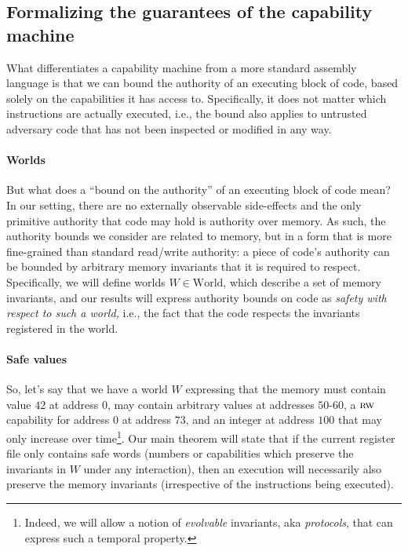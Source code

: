 \documentclass[format=acmsmall, review=true, screen=true]{acmart}
\newcommand{\plaindom}[1]{\mathrm{#1}}
\newcommand{\Worlds}{\plaindom{World}}
\newcommand{\plainperm}[1]{\textsc{#1}}
\newcommand{\readwrite}{\plainperm{rw}}
\newenvironment{toplas}{}{}
\begin{document}
\begin{toplas}
\subsection{Formalizing the guarantees of the capability machine}
\label{sec:formalizing-guarantees}
What differentiates a capability machine from a more standard assembly language
is that we can bound the authority of an executing block of code, based solely
on the capabilities it has access to. Specifically, it does not matter which
instructions are actually executed, i.e., the bound also applies to untrusted
adversary code that has not been inspected or modified in any way.

\paragraph{Worlds}
But what does a ``bound on the authority'' of an executing block of code mean?
In our setting, there are no externally observable side-effects and the only
primitive authority that code may hold is authority over memory. As such, the
authority bounds we consider are related to memory, but in a form that is more
fine-grained than standard read/write authority: a piece of code's authority can be bounded
by arbitrary memory invariants that it is required to respect. Specifically, we
will define worlds $W \in \Worlds$, which describe a set of memory invariants, and
our results will express authority bounds on code as \emph{safety with respect to such
a world,} i.e., the fact that the code respects the invariants registered in
the world.

\paragraph{Safe values}
So, let's say that we have a world $W$ expressing that the memory must contain
value $42$ at address $0$, may contain arbitrary values at
addresses $50$-$60$, a $\readwrite$ capability for address $0$ at address $73$, and
an integer at address $100$ that may only increase over time\footnote{Indeed, we
  will allow a notion of \emph{evolvable} invariants, aka \emph{protocols}, that can
  express such a temporal property.}. Our main theorem will state that if the
current register file only contains safe words (numbers or capabilities which
preserve the invariants in $W$ under any interaction), then an execution will
necessarily also preserve the memory invariants (irrespective of the instructions being
executed).


\end{toplas}
\end{document}
